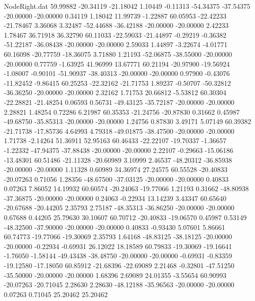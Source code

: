 \begin{filecontents}{NodeRight.dat}
  59.99882  -20.34119  -21.18042     1.10449   -0.11313  -54.34375  -37.54375  -20.00000  -20.00000    0.34119    1.18042   11.99739   -1.22887
  60.05953  -22.42233  -21.78467     3.36068    3.32487  -52.44688  -36.42188  -20.00000  -20.00000    2.42233    1.78467   36.71918   36.32790
  60.11033  -22.59033  -21.44897    -0.29219   -0.36382  -51.22187  -36.08438  -20.00000  -20.00000    2.59033    1.44897   -3.22674   -4.01771
  60.16098  -20.77759  -18.36075     3.71880    1.21193  -52.06875  -38.55000  -20.00000  -20.00000    0.77759   -1.63925   41.96999   13.67771
  60.21194  -20.97900  -19.56924    -1.08007   -0.90101  -51.90937  -38.40313  -20.00000  -20.00000    0.97900   -0.43076  -11.82452   -9.86415
  60.25253  -22.32162  -21.71753     1.89237   -0.50707  -50.32812  -36.36250  -20.00000  -20.00000    2.32162    1.71753   20.66812   -5.53812
  60.30304  -22.28821  -21.48254     0.06593    0.56731  -49.43125  -35.72187  -20.00000  -20.00000    2.28821    1.48254    0.72286    6.21987
  60.35353  -21.24756  -20.87830     0.31662    0.45987  -49.68750  -35.85313  -20.00000  -20.00000    1.24756    0.87830    3.49171    5.07149
  60.39382  -21.71738  -17.85736     4.64993    4.79318  -49.01875  -38.47500  -20.00000  -20.00000    1.71738   -2.14264   51.36911   52.95163
  60.46433  -22.22107  -19.70337    -1.36657   -1.22332  -47.94375  -37.88438  -20.00000  -20.00000    2.22107   -0.29663  -15.06186  -13.48301
  60.51486  -21.11328  -20.60989     3.10999    2.46537  -48.20312  -36.85938  -20.00000  -20.00000    1.11328    0.60989   34.36974   27.24575
  60.55528  -20.40833  -20.07263     0.71056    1.28356  -48.67500  -37.03125  -20.00000  -20.00000    0.40833    0.07263    7.86052   14.19932
  60.60574  -20.24063  -19.77066     1.21193    0.31662  -48.80938  -37.36875  -20.00000  -20.00000    0.24063   -0.22934   13.14239    3.43347
  60.65640  -20.67688  -20.44205     2.35793    2.75187  -48.35313  -36.86250  -20.00000  -20.00000    0.67688    0.44205   25.79630   30.10607
  60.70712  -20.40833  -19.06570     0.45987    0.53149  -48.32500  -37.90000  -20.00000  -20.00000    0.40833   -0.93430    5.07601    5.86661
  60.74773  -19.77066  -19.30069     2.35793    1.64168  -48.83125  -38.18125  -20.00000  -20.00000   -0.22934   -0.69931   26.12022   18.18589
  60.79833  -19.30069  -19.16641    -1.76050   -1.58144  -49.43438  -38.48750  -20.00000  -20.00000   -0.69931   -0.83359  -19.12580  -17.18050
  60.85912  -21.68396  -22.69089     2.21468   -0.32801  -47.51250  -35.50000  -20.00000  -20.00000    1.68396    2.69089   24.01355   -3.55654
  60.90993  -20.07263  -20.71045     2.28630    2.28630  -48.12188  -35.96563  -20.00000  -20.00000    0.07263    0.71045   25.20462   25.20462

\end{filecontents}
